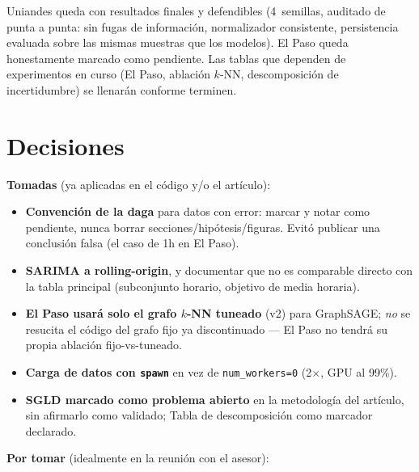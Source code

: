 \documentclass[12pt,a4paper]{article}
\begin{document}
Uniandes queda con resultados finales y defendibles (4~semillas, auditado
de punta a punta: sin fugas de información, normalizador consistente,
persistencia evaluada sobre las mismas muestras que los modelos). El Paso
queda honestamente marcado como pendiente. Las tablas que dependen de
experimentos en curso (El Paso, ablación $k$-NN, descomposición de
incertidumbre) se llenarán conforme terminen.

\section{Decisiones}

\textbf{Tomadas} (ya aplicadas en el código y/o el artículo):

\begin{itemize}[leftmargin=1.5em, noitemsep]
  \item \textbf{Convención de la daga} para datos con error: marcar y notar
        como pendiente, nunca borrar secciones/hipótesis/figuras. Evitó
        publicar una conclusión falsa (el caso de 1h en El Paso).
  \item \textbf{SARIMA a rolling-origin}, y documentar que no es comparable
        directo con la tabla principal (subconjunto horario, objetivo de
        media horaria).
  \item \textbf{El Paso usará solo el grafo $k$-NN tuneado} (v2) para
        GraphSAGE; \emph{no} se resucita el código del grafo fijo ya
        discontinuado --- El Paso no tendrá su propia ablación fijo-vs-tuneado.
  \item \textbf{Carga de datos con \texttt{spawn}} en vez de
        \texttt{num\_workers=0} (2$\times$, GPU al 99\%).
  \item \textbf{SGLD marcado como problema abierto} en la metodología del
        artículo, sin afirmarlo como validado; Tabla de descomposición como
        marcador declarado.
\end{itemize}

\textbf{Por tomar} (idealmente en la reunión con el asesor):
\end{document}

